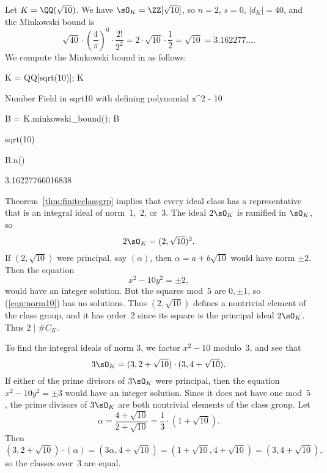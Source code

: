 \begin{example}
	Let $K=\QQ(\sqrt{10})$. We have $\sO_K = \ZZ[\sqrt{10}]$,
	so $n=2$, $s=0$, $|d_K| = 40$, and the Minkowski bound is
	\[
		\sqrt{40}\cdot \left(\frac{4}{\pi}\right)^0 \cdot \frac{2!}{2^2}
		= 2\cdot \sqrt{10} \cdot \frac{1}{2} = \sqrt{10} = 3.162277\dots.
	\]
	We compute the Minkowski bound in {\Sage} as follows:
	\begin{sagecode}
		\begin{sagecell}
			K = QQ[sqrt(10)]; K
		\end{sagecell}
		\begin{sageout}
			Number Field in sqrt10 with defining polynomial x^2 - 10
		\end{sageout}
		\begin{sagecell}
			B = K.minkowski_bound(); B
		\end{sagecell}
		\begin{sageout}
			sqrt(10)
		\end{sageout}
		\begin{sagecell}
			B.n()
		\end{sagecell}
		\begin{sageout}
			3.16227766016838
		\end{sageout}
	\end{sagecode}
	Theorem~\ref{thm:finiteclassgrp} implies that every ideal class has a
	representative that is an integral ideal of norm~$1$,~$2$, or~$3$.
	The ideal $2\sO_K$ is ramified in $\sO_K$, so
	$$
	2\sO_K = (2,\sqrt{10})^2.
	$$
	If $(2,\sqrt{10})$ were principal, say $(\alpha)$, then
	$\alpha=a+b\sqrt{10}$ would have norm $\pm 2$.
	Then the equation
	\begin{equation}\label{eqn:norm10}
	x^2 - 10y^2 = \pm 2,
	\end{equation}
	would have an integer solution.  But the squares mod~$5$ are
	$0,\pm 1$, so (\ref{eqn:norm10}) has no solutions.
	Thus $(2,\sqrt{10})$ defines a nontrivial element of the class group,
	and it has order~$2$ since its square is the principal ideal $2\sO_K$.
	Thus $2\mid \#C_K$.
	
	To find the integral ideals of norm $3$, we
	factor $x^2-10$ modulo~$3$, and see that
	$$
	3\sO_K  = (3,2+\sqrt{10}) \cdot (3,4+\sqrt{10}).
	$$
	If either of the prime divisors of $3\sO_K$ were principal,
	then the equation $x^2-10y^2 = \pm 3$ would have an integer
	solution.  Since it does not have one mod~$5$, the prime divisors
	of $3\sO_K$ are both nontrivial elements of the class
	group. Let
	$$
	\alpha = \frac{4+\sqrt{10}}{2+\sqrt{10}} = \frac{1}{3}\cdot (1+\sqrt{10}).
	$$
	Then
	$$
	(3,2+\sqrt{10})\cdot (\alpha) =  (3\alpha, 4+\sqrt{10})
	=  (1+\sqrt{10}, 4+\sqrt{10})
	=  (3, 4+\sqrt{10}),
	$$
	so the classes over~$3$ are equal.
	

\end{example}
